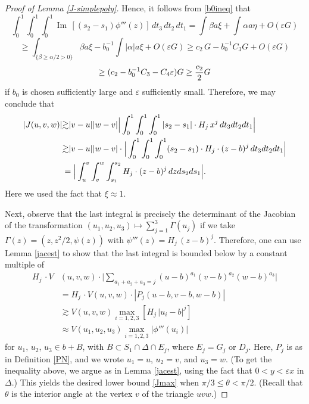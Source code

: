 \documentclass[11 pt]{amsart}
\theoremstyle{plain}
\numberwithin{equation}{section}
\theoremstyle{plain}
\numberwithin{equation}{section}
\theoremstyle{remark}
\begin{document}
\begin{proof}[Proof of Lemma \ref{J-simplepoly}]
Hence, it follows from \eqref{b0ineq} that
\[  \int_0^1 \int_0^1 \int_0^1 {\operatorname{Im\,}}[(s_2-s_1)\phi'''(z)] \, dt_3 \, dt_2 \, dt_1 =
\int \beta a \xi +  \int\alpha a \eta +  O({\varepsilon} G)
\]
\[  \ge \int_{\{\beta \ge \alpha/2 > 0 \}} \beta a \xi - b_0^{-1} \int |\alpha| a\xi + O({\varepsilon} G)
 \ge c_2 \, G - b_0^{-1} C_3 G + O({\varepsilon} G)
 \]
\[ \ge (c_2 - b_0^{-1} C_3 - C_4 {\varepsilon}) G \ge {c_2\over 2} G
\]
if $b_0$ is chosen sufficiently large and ${\varepsilon}$ sufficiently small.
Therefore, we may conclude that
\begin{align}\label{jaclowerbd}
|J (u, v, w)| &{\gtrsim}
|v-u||w-v| \Big| \int_0^1 \int_0^1 \int_0^1 |s_2-s_1| \cdot H_j \, x^j \, dt_3 dt_2 dt_1 \Big| \\ \notag
&{\gtrsim} |v-u||w-v| \cdot \Big| \int_0^1 \int_0^1 \int_0^1 (s_2-s_1) \cdot H_j \cdot (z-b)^j \, dt_3 dt_2 dt_1 \Big| \\ \notag
&= \Big| \int_u^v \int_v^w \int_{s_1}^{s_2} H_j \cdot  (z-b)^j \, dz ds_2 ds_1 \Big| . \notag
\end{align}
Here we used the fact that $\xi \approx 1$.
\medskip

Next, observe that the last integral is precisely the determinant of the Jacobian of the transformation $(u_1, u_2, u_3) \mapsto \sum_{j=1}^3 \Gamma(u_j)$ if we take $\Gamma(z) = (z, z^2/2, \psi(z))$ with $\psi'''(z) = H_j \, (z-b)^j$. Therefore, one can use Lemma \ref{jacest} to show that the last integral is bounded below by a constant multiple of
\begin{align*}
H_j \, \cdot V &(u,v,w) \cdot \Big| \sum_{a_1+a_2+a_3=j} (u-b)^{a_1} (v-b)^{a_2} (w-b)^{a_3}\Big|
\\
& = H_j \, \cdot V(u,v,w)\cdot |P_j (u-b, v-b, w-b)|
\\
& {\gtrsim} V(u,v,w) \max_{i=1,2,3} [H_j \, |u_i -b|^j] \\
&\approx V(u_1, u_2, u_3) \max_{i=1,2,3} |\phi'''(u_i)|
\end{align*}
for $u_1$, $u_2$, $u_3 \in b+ B$, with $B \subset S_1 \cap\Delta \cap E_j$, where $E_j = G_j$ or $D_j$. Here, $P_j$ is as in Definition \ref{PN}, and we wrote $u_1=u$, $u_2=v$, and $u_3 =w$. (To get the inequality above, we argue as in Lemma \ref{jacest}, using the fact that $0< y < {\varepsilon} x$ in $\Delta$.) This yields the desired lower bound \eqref{Jmax} when $\pi/3 \le \theta < \pi/2$.
(Recall that $\theta$ is the interior angle at the vertex $v$ of the triangle $uvw$.)

\medskip


\end{proof}
\end{document}
